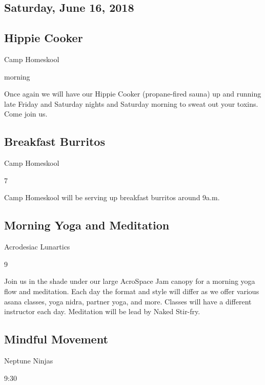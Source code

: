 \begin{multicols}{2}
\columnbreak
\section*{Saturday, June 16, 2018}
\subsection*{Hippie Cooker}
\begin{description}[leftmargin=6em,noitemsep,style=nextline]
	\item[Camp:] Camp Homeskool
  \item[Times:] morning
\end{description}

Once again we will have our Hippie Cooker (propane-fired sauna) up and running late Friday and Saturday nights and  Saturday morning to sweat out your toxins. Come join us.

\subsection*{Breakfast Burritos}
\begin{description}[leftmargin=6em,noitemsep,style=nextline]
	\item[Camp:] Camp Homeskool
  \item[Times:] 7\pm
\end{description}

Camp Homeskool will be serving up breakfast burritos around 9a.m.

\subsection*{Morning Yoga and Meditation}
\begin{description}[leftmargin=6em,noitemsep,style=nextline]
	\item[Camp:] Acrodesiac Lunartics
  \item[Times:] 9\am
\end{description}

Join us in the shade under our large AcroSpace Jam canopy for a morning yoga flow and meditation. Each day the format and style will differ as we offer various asana classes, yoga nidra, partner yoga, and more. Classes will have a different instructor each day. Meditation will be lead by Naked Stir-fry. 


\subsection*{Mindful Movement}
\begin{description}[leftmargin=6em,noitemsep,style=nextline]
	\item[Camp:] Neptune Ninjas
  \item[Times:] 9:30\am
\end{description}


\end{multicols}
